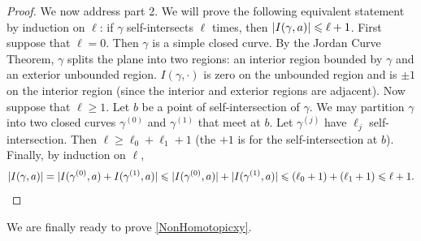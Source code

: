 \documentclass[a4paper,11pt]{article}
\renewcommand{\geq}{\geqslant}
\renewcommand{\leq}{\leqslant}
\DeclarePairedDelimiter{\abs}{\lvert}{\rvert} %
\begin{document}
\begin{proof}
    We now address part 2. We will prove the following equivalent statement by induction on $\ell$: if $\gamma$ self-intersects $\ell$ times, then $\abs{I(\gamma, a)} \leq \ell + 1$. First suppose that $\ell = 0$. Then $\gamma$ is a simple closed curve. By the Jordan Curve Theorem, $\gamma$ splits the plane into two regions: an interior region bounded by $\gamma$ and an exterior unbounded region. $I(\gamma, \cdot)$ is zero on the unbounded region and is $\pm 1$ on the interior region (since the interior and exterior regions are adjacent). Now suppose that $\ell \geq 1$. Let $b$ be a point of self-intersection of $\gamma$. We may partition $\gamma$ into two closed curves $\gamma^{(0)}$ and $\gamma^{(1)}$ that meet at $b$. Let $\gamma^{(j)}$ have $\ell_j$ self-intersection. Then $\ell \geq \ell_0 + \ell_1 + 1$ (the $+1$ is for the self-intersection at $b$). Finally, by induction on $\ell$,
    \begin{equation*}
        \abs{I(\gamma, a)} = \abs{I(\gamma^{(0)}, a) + I(\gamma^{(1)}, a)} \leq \abs{I(\gamma^{(0)}, a)} + \abs{I(\gamma^{(1)}, a)} \leq (\ell_0 + 1) + (\ell_1 + 1) \leq \ell + 1. \qedhere
    \end{equation*}
\end{proof}

We are finally ready to prove \cref{NonHomotopicxy}.
\end{document}
